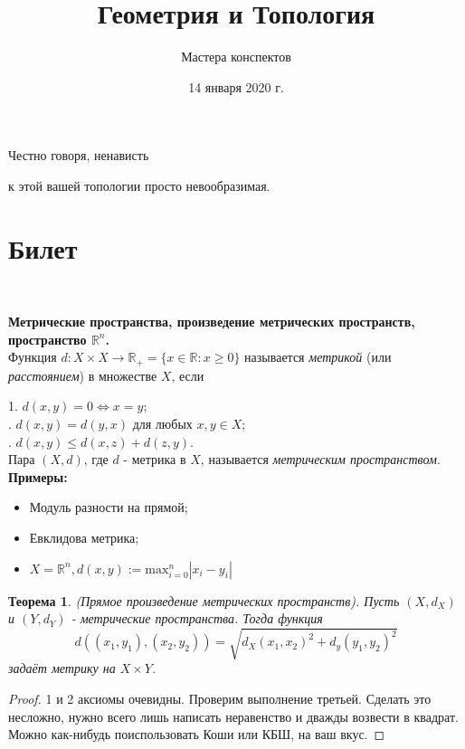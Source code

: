 \documentclass[a4paper,100pt]{article}
\title{Геометрия и Топология}
\author{Мастера конспектов}
\date{14 января 2020 г.}
\theoremstyle{indented}
\newtheorem{theorem}{Теорема}
\begin{document}
\maketitle 

\newpage

\hypertarget{t1}{Честно говоря, ненависть} к этой вашей топологии просто невообразимая.
\tableofcontents

\newpage

\section{Билет} \

\medskip

\textbf{Метрические пространства, произведение метрических пространств, пространство $\mathbb{R}^n$.} \\

Функция $d: X \times X \rightarrow \mathbb{R}_+ = \{x \in \mathbb{R} : x\geq 0\}$ называется \hypertarget{n1}{\textit{метрикой}} (или \textit{расстоянием}) 
в множестве $X$, если \

\medskip

1. $d(x, y)=0 \Leftrightarrow x=y$; \\
. $d(x, y)= d(y, x)$ для любых $x, y \in X$; \\
. $d(x, y)\leq d(x, z)+d(z, y)$. \\

Пара $(X, d)$, где $d$ - метрика в $X$, называется \hypertarget{n2}{\textit{метрическим пространством}}. \\

\textbf{Примеры:}

\begin{itemize}
    \item Модуль разности на прямой;
    \item Евклидова метрика;
    \item $X=\mathbb{R}^n, d(x,y):=\text{max}_{i=0}^n|x_i-y_i|$
\end{itemize}

\begin{theorem}
(Прямое произведение метрических пространств). Пусть $(X, d_X)$ и $(Y, d_Y)$ - метрические пространства. Тогда функция
\[
    d((x_1, y_1), (x_2, y_2))=\sqrt{d_X(x_1, x_2)^2+d_y(y_1, y_2)^2}
\]
задаёт метрику на $X\times Y$.
\end{theorem}

\begin{proof}
1 и 2 аксиомы очевидны. Проверим выполнение третьей. Сделать это несложно, нужно всего лишь написать неравенство и дважды возвести в квадрат. Можно как-нибудь поиспользовать Коши или КБШ, на ваш вкус.
\end{proof}
\end{document}
